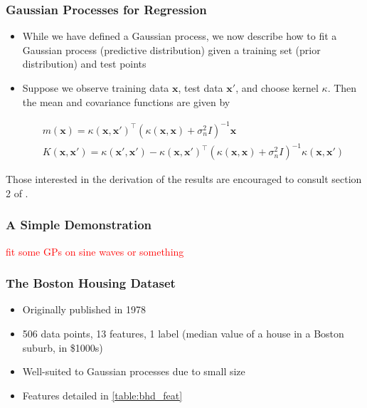 \documentclass[pdf]{beamer}
\newcommand{\bx}{\boldsymbol{x}}
\newcommand{\todo}[1]{\textcolor{red}{#1}}
\begin{document}
\begin{frame}
  \frametitle{Gaussian Processes for Regression}

  \begin{itemize}
    \item While we have defined a Gaussian process, we now describe how to fit a Gaussian process (predictive
      distribution) given a training set (prior distribution) and test points
    \item Suppose we observe training data $\bx$, test data $\bx'$, and choose kernel $\kappa$. Then the mean and
      covariance functions are given by 

      \begin{gather*}
        m(\boldsymbol{x})=\kappa(\bx, \bx')^\top \left(\kappa(\bx, \bx) + \sigma_{n}^{2} I\right)^{-1}\bx \\
        K(\boldsymbol{x},\boldsymbol{x'}) = \kappa(\bx', \bx') - \kappa(\bx, \bx')^{\top}\left(\kappa(\bx, \bx) +
        \sigma_{n}^{2}I\right)^{-1}\kappa(\bx, \bx')
      \end{gather*}
  \end{itemize}

  Those interested in the derivation of the results are encouraged to consult section 2 of \cite{rasmussen_gaussian_2006}.
\end{frame}

\begin{frame}
  \frametitle{A Simple Demonstration}

  \todo{fit some GPs on sine waves or something}
\end{frame}

\begin{frame}
  \frametitle{The Boston Housing Dataset}
  \begin{itemize}
    \item Originally published in 1978\cite{harrison_hedonic_1978}
    \item 506 data points, 13 features, 1 label (median value of a house in a Boston suburb, in \$1000s)
    \item Well-suited to Gaussian processes due to small size
    \item Features detailed in \ref{table:bhd_feat}
  \end{itemize}
\end{frame}
\end{document}
